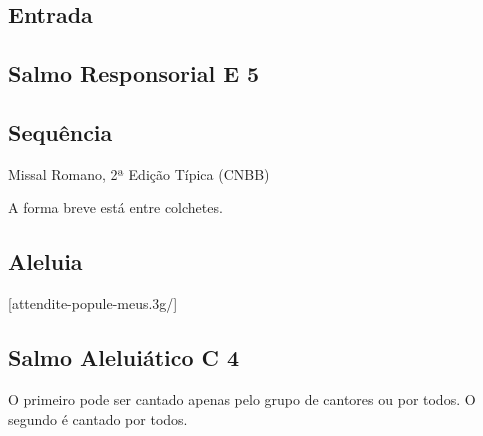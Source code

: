 
\subsection{Entrada}\label{subsection:tempus-per-annum/sanctissimi-corporis-et-sanguinis-christi/introitus}

\AllowPageFlush

\subsection[Salmo Responsorial]{Salmo Responsorial \textmd{E 5}}\label{subsection:tempus-per-annum/sanctissimi-corporis-et-sanguinis-christi/psalmus-responsorius}

\subsection{Sequência}\label{subsection:tempus-per-annum/sanctissimi-corporis-et-sanguinis-christi/sequentia}
\begin{annotation}
  Missal Romano, 2ª Edição Típica (CNBB)
\end{annotation}
\begin{rubrica}
  A forma breve está entre colchetes.
\end{rubrica}

\subsection{Aleluia}\label{subsection:tempus-per-annum/sanctissimi-corporis-et-sanguinis-christi/alleluia}
[attendite-popule-meus.3g/]

\AllowPageFlush

\subsection[Salmo Aleluiático]{Salmo Aleluiático \textmd{C 4}}\label{subsection:tempus-per-annum/sanctissimi-corporis-et-sanguinis-christi/psalmus-alleluiaticus}
\begin{rubrica}
  O primeiro {\normalfont\Rbar} pode ser cantado apenas pelo grupo de cantores ou por todos. O segundo {\normalfont\Rbar} é cantado por todos.
\end{rubrica}

